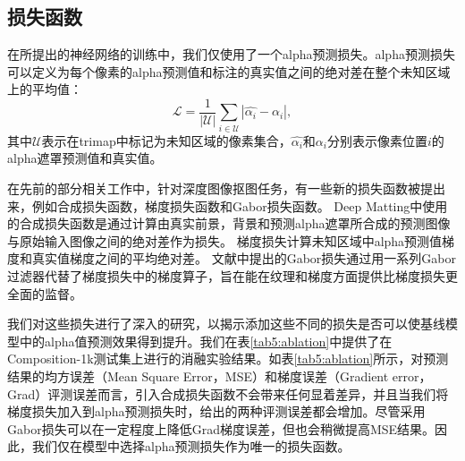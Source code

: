 \subsection{损失函数}
在所提出的神经网络的训练中，我们仅使用了一个alpha预测损失。alpha预测损失可以定义为每个像素的alpha预测值和标注的真实值之间的绝对差在整个未知区域上的平均值：
\begin{equation}
\mathcal{L} = \frac{1}{|\mathcal{U}|} \sum_{i\in \mathcal{U}}|\hat{\alpha_i}-\alpha_i|,
\label{eq5:loss}
\end{equation}
其中$ \mathcal {U} $表示在trimap中标记为未知区域的像素集合，$ \hat{\alpha_i} $和$ \alpha_i $分别表示像素位置$ i $的alpha遮罩预测值和真实值。

在先前的部分相关工作中，针对深度图像抠图任务，有一些新的损失函数被提出来，例如合成损失函数\cite{xu2017deep}，梯度损失函数\cite{samplenet}和Gabor损失函数\cite{li2019inductive}。
Deep Matting\cite{xu2017deep}中使用的合成损失函数是通过计算由真实前景，背景和预测alpha遮罩所合成的预测图像与原始输入图像之间的绝对差作为损失。
梯度损失计算未知区域中alpha预测值梯度和真实值梯度之间的平均绝对差。
文献\parencite{li2019inductive}中提出的Gabor损失通过用一系列Gabor过滤器代替了梯度损失中的梯度算子，旨在能在纹理和梯度方面提供比梯度损失更全面的监督。

我们对这些损失进行了深入的研究，以揭示添加这些不同的损失是否可以使基线模型中的alpha值预测效果得到提升。我们在表\ref{tab5:ablation}中提供了在Composition-1k测试集\cite{xu2017deep}上进行的消融实验结果。如表\ref{tab5:ablation}所示，对预测结果的均方误差（Mean Square Error，MSE）和梯度误差（Gradient error，Grad）评测误差而言，引入合成损失函数不会带来任何显着差异，并且当我们将梯度损失加入到alpha预测损失时，给出的两种评测误差都会增加。尽管采用Gabor损失可以在一定程度上降低Grad梯度误差，但也会稍微提高MSE结果。因此，我们仅在模型中选择alpha预测损失作为唯一的损失函数。



